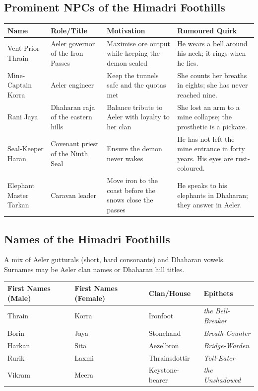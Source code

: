 \subsection*{Prominent NPCs of the Himadri Foothills}
\label{sec:himadri-npcs}

\begin{longtable}{|p{}|p{}|p{}|p{}|}
\hline
\textbf{Name} & \textbf{Role/Title} & \textbf{Motivation} & \textbf{Rumoured Quirk} \\
\hline
Vent-Prior Thrain & Aeler governor of the Iron Passes & Maximise ore output while keeping the demon sealed & He wears a bell around his neck; it rings when he lies. \\
\hline
Mine-Captain Korra & Aeler engineer & Keep the tunnels safe and the quotas met & She counts her breaths in eights; she has never reached nine. \\
\hline
Rani Jaya & Dhaharan raja of the eastern hills & Balance tribute to Aeler with loyalty to her clan & She lost an arm to a mine collapse; the prosthetic is a pickaxe. \\
\hline
Seal-Keeper Haran & Covenant priest of the Ninth Seal & Ensure the demon never wakes & He has not left the mine entrance in forty years. His eyes are rust-coloured. \\
\hline
Elephant Master Tarkan & Caravan leader & Move iron to the coast before the snows close the passes & He speaks to his elephants in Dhaharan; they answer in Aeler. \\
\hline
\end{longtable}

\subsection*{Names of the Himadri Foothills}
\label{sec:himadri-names}

A mix of Aeler gutturals (short, hard consonants) and Dhaharan vowels. Surnames may be Aeler clan names or Dhaharan hill titles.

\begin{longtable}{|p{}|p{}|p{}|p{}|}
\hline
\textbf{First Names (Male)} & \textbf{First Names (Female)} & \textbf{Clan/House} & \textbf{Epithets} \\
\hline
Thrain & Korra & Ironfoot & \textit{the Bell-Breaker} \\
\hline
Borin & Jaya & Stonehand & \textit{Breath-Counter} \\
\hline
Harkan & Sita & Aezelbron & \textit{Bridge-Warden} \\
\hline
Rurik & Laxmi & Thrainsdottir & \textit{Toll-Eater} \\
\hline
Vikram & Meera & Keystone-bearer & \textit{the Unshadowed} \\
\hline
\end{longtable}

